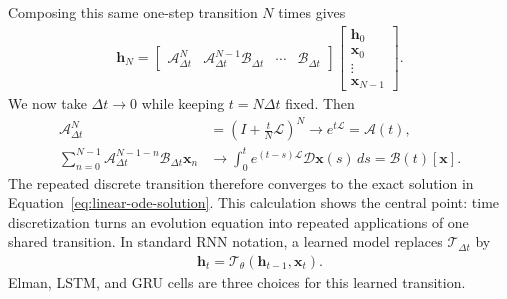 \documentclass[11pt]{article}
\begin{document}
Composing this same one-step transition $N$ times gives
\begin{equation}
  \begin{split}
  \bm{h}_N
  =
  \begin{bmatrix}
    \mathcal A_{\Delta t}^{N}
    & \mathcal A_{\Delta t}^{N-1}\mathcal B_{\Delta t}
    & \cdots
    & \mathcal B_{\Delta t}
  \end{bmatrix}
  \begin{bmatrix}
    \bm{h}_0\\
    \bm{x}_0\\
    \vdots\\
    \bm{x}_{N-1}
  \end{bmatrix}.
  \label{eq:discrete-evolution}
  \end{split}
\end{equation}
We now take $\Delta t\to0$ while keeping $t=N\Delta t$ fixed.  Then
\begin{equation}
  \begin{split}
  \mathcal A_{\Delta t}^{N}
  &=\left(I+\frac{t}{N}\mathcal L\right)^N
    \longrightarrow e^{t\mathcal L}
    =\mathcal A(t),\\
  \sum_{n=0}^{N-1}
    \mathcal A_{\Delta t}^{N-1-n}
    \mathcal B_{\Delta t}\bm{x}_n
  &\longrightarrow
    \int_0^t e^{(t-s)\mathcal L}\mathcal D\bm{x}(s)\,ds
    =\mathcal B(t)[\bm{x}].
  \label{eq:continuous-time-limit}
  \end{split}
\end{equation}
The repeated discrete transition therefore converges to the exact solution in
Equation~\eqref{eq:linear-ode-solution}.  This calculation shows the central
point: time discretization turns an evolution equation into repeated
applications of one shared transition.  In standard RNN notation, a learned
model replaces $\mathcal T_{\Delta t}$ by
\begin{equation}
  \begin{split}
  \bm{h}_t=\mathcal T_\theta(\bm{h}_{t-1},\bm{x}_t).
  \label{eq:shared-rnn}
  \end{split}
\end{equation}
Elman, LSTM, and GRU cells are three choices for this learned transition.
\end{document}
